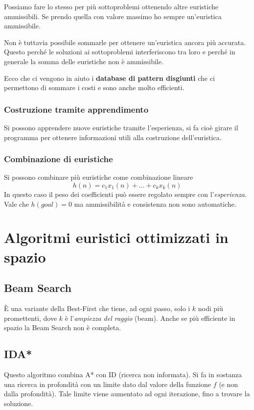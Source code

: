 Possiamo fare lo stesso per pi\`u sottoproblemi ottenendo altre euristiche
ammissibili. Se prendo quella con valore massimo ho sempre un'euristica ammissibile.

Non \`e tuttavia possibile sommarle per ottenere un'euristica ancora pi\`u accurata. Questo
perch\'e le soluzioni ai sottoproblemi interferiscono tra loro e perch\'e in generale la somma
delle euristiche non \`e ammissibile.

Ecco che ci vengono in aiuto i \textbf{database di pattern disgiunti} che ci permettono di
sommare i costi e sono anche molto efficienti.

\subsubsection{Costruzione tramite apprendimento}
Si possono apprendere nuove euristiche tramite l'esperienza, si fa cio\`e girare il programma
per ottenere informazioni utili alla costruzione dell'euristica.

\subsubsection{Combinazione di euristiche}
Si possono combinare pi\`u euristiche come combinazione lineare
\[ h(n) = c_1 x_1(n) + \dots + c_k x_k(n) \]
In questo caso il peso dei coefficienti pu\`o essere regolato sempre con l'\emph{esperienza}.
Vale che $h(goal) = 0$ ma ammissibilit\`a e consistenza non sono automatiche.

\section{Algoritmi euristici ottimizzati in spazio}
\subsection{Beam Search}
\`E una variante della Best-First che tiene, ad ogni passo, solo i $k$ nodi pi\`u
promettenti, dove $k$ \`e l'\emph{ampiezza del raggio} (beam). Anche se pi\`u efficiente
in spazio la Beam Search non \`e completa.

\subsection{IDA*}
Questo algoritmo combina A* con ID (ricerca non informata). Si fa in sostanza una ricerca in
profondit\`a con un limite dato dal valore della funzione $f$ (e non dalla profondit\`a).
Tale limite viene aumentato ad ogni iterazione, fino a trovare la soluzione.

